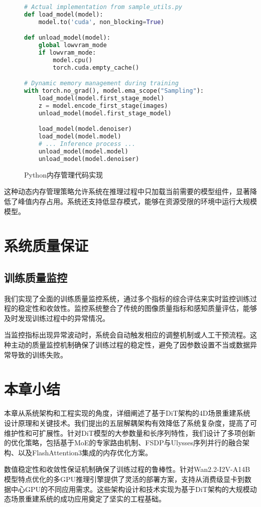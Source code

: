 \begin{figure}[!b]
  \begin{tmpbox}
    \begin{lstlisting}[language=Python]
# Actual implementation from sample_utils.py
def load_model(model):
    model.to('cuda', non_blocking=True)

def unload_model(model):
    global lowvram_mode
    if lowvram_mode:
        model.cpu()
        torch.cuda.empty_cache()

# Dynamic memory management during training
with torch.no_grad(), model.ema_scope("Sampling"):
    load_model(model.first_stage_model)
    z = model.encode_first_stage(images)
    unload_model(model.first_stage_model)

    load_model(model.denoiser)
    load_model(model.model)
    # ... Inference process ...
    unload_model(model.model)
    unload_model(model.denoiser)
\end{lstlisting}
  \end{tmpbox}
  \caption{Python内存管理代码实现}
  \label{fig:python-memory}
\end{figure}

这种动态内存管理策略允许系统在推理过程中只加载当前需要的模型组件，显著降低了峰值内存占用。系统还支持低显存模式，能够在资源受限的环境中运行大规模模型。

\section{系统质量保证}

\subsection{训练质量监控}

我们实现了全面的训练质量监控系统，通过多个指标的综合评估来实时监控训练过程的稳定性和收敛性。监控系统整合了传统的图像质量指标和感知质量评估，能够及时发现训练过程中的异常情况。

当监控指标出现异常波动时，系统会自动触发相应的调整机制或人工干预流程。这种主动的质量监控机制确保了训练过程的稳定性，避免了因参数设置不当或数据异常导致的训练失败。

\section{本章小结}

本章从系统架构和工程实现的角度，详细阐述了基于DiT架构的4D场景重建系统设计原理和关键技术。我们提出的五层解耦架构有效降低了系统复杂度，提高了可维护性和可扩展性。针对DiT模型的大参数量和长序列特性，我们设计了多项创新的优化策略，包括基于MoE的专家路由机制、FSDP与Ulysses序列并行的融合架构、以及FlashAttention3集成的内存优化方案。

数值稳定性和收敛性保证机制确保了训练过程的鲁棒性。针对Wan2.2-I2V-A14B模型特点优化的多GPU推理引擎提供了灵活的部署方案，支持从消费级显卡到数据中心GPU的不同应用需求。这些架构设计和技术实现为基于DiT架构的大规模动态场景重建系统的成功应用奠定了坚实的工程基础。
